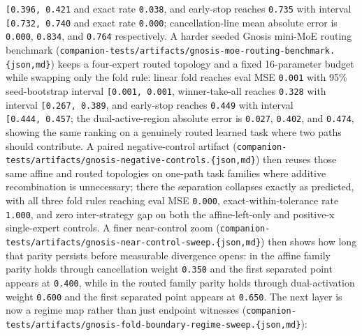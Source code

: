 \documentclass[
  11pt,
]{article}
\begin{document}
\texttt{{[}\textasciigrave{}\textasciigrave{}0.396,\ 0.421\textasciigrave{}\textasciigrave{}{]}}
and exact rate \texttt{0.038}, and early-stop reaches \texttt{0.735}
with interval
\texttt{{[}\textasciigrave{}\textasciigrave{}0.732,\ 0.740\textasciigrave{}\textasciigrave{}{]}}
and exact rate \texttt{0.000}; cancellation-line mean absolute error is
\texttt{0.000}, \texttt{0.834}, and \texttt{0.764} respectively. A
harder seeded Gnosis mini-MoE routing benchmark
(\texttt{companion-\allowbreak{}tests/\allowbreak{}artifacts/\allowbreak{}gnosis-\allowbreak{}moe-\allowbreak{}routing-\allowbreak{}benchmark.\allowbreak{}\{json,md\}})
keeps a four-expert routed topology and a fixed 16-parameter budget
while swapping only the fold rule: linear fold reaches eval MSE
\texttt{0.001} with 95\% seed-bootstrap interval
\texttt{{[}\textasciigrave{}\textasciigrave{}0.001,\ 0.001\textasciigrave{}\textasciigrave{}{]}},
winner-take-all reaches \texttt{0.328} with interval
\texttt{{[}\textasciigrave{}\textasciigrave{}0.267,\ 0.389\textasciigrave{}\textasciigrave{}{]}},
and early-stop reaches \texttt{0.449} with interval
\texttt{{[}\textasciigrave{}\textasciigrave{}0.444,\ 0.457\textasciigrave{}\textasciigrave{}{]}};
the dual-active-region absolute error is \texttt{0.027}, \texttt{0.402},
and \texttt{0.474}, showing the same ranking on a genuinely routed
learned task where two paths should contribute. A paired
negative-control artifact
(\texttt{companion-\allowbreak{}tests/\allowbreak{}artifacts/\allowbreak{}gnosis-\allowbreak{}negative-\allowbreak{}controls.\allowbreak{}\{json,md\}})
then reuses those same affine and routed topologies on one-path task
families where additive recombination is unnecessary; there the
separation collapses exactly as predicted, with all three fold rules
reaching eval MSE \texttt{0.000}, exact-within-tolerance rate
\texttt{1.000}, and zero inter-strategy gap on both the affine-left-only
and positive-x single-expert controls. A finer near-control zoom
(\texttt{companion-\allowbreak{}tests/\allowbreak{}artifacts/\allowbreak{}gnosis-\allowbreak{}near-\allowbreak{}control-\allowbreak{}sweep.\allowbreak{}\{json,md\}})
then shows how long that parity persists before measurable divergence
opens: in the affine family parity holds through cancellation weight
\texttt{0.350} and the first separated point appears at \texttt{0.400},
while in the routed family parity holds through dual-activation weight
\texttt{0.600} and the first separated point appears at \texttt{0.650}.
The next layer is now a regime map rather than just endpoint witnesses
(\texttt{companion-\allowbreak{}tests/\allowbreak{}artifacts/\allowbreak{}gnosis-\allowbreak{}fold-\allowbreak{}boundary-\allowbreak{}regime-\allowbreak{}sweep.\allowbreak{}\{json,md\}}):
\end{document}
